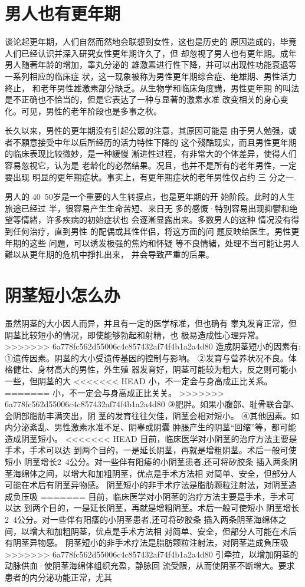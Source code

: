 \documentclass[12pt,UTF8]{ctexbook}
\begin{document}
\section{男人也有更年期}

谈论起更年期，人们自然而然地会联想到女性，这也是历史的
原因造成的，毕竟人们已经认识并深入研究女性更年期许久了，但
却忽视了男人也有更年期。成年男人随著年龄的增加，睾丸分泌的
雄激素进行性下降，并可以出现性功能衰退等一系列相应的临床症
状，这一现象被称为男性更年期综合症、绝雄期、男性活力終止，
和老年男性雄激素部分缺乏。从生物学和临床角度講，男性更年期
的叫法是不正确也不恰当的，但是它表达了一种与显著的激素水准
改变相关的身心变化。可见，男性的老年阶段也是多事之秋。

长久以来，男性的更年期没有引起公眾的注意，其原因可能是
由于男人勉强，或者不願意接受中年以后所经历的活力特性下降的
这个殘酷现实，而且男性更年期的临床表现比较微妙，是一种緩慢
漸进性过程，有非常大的个体差异，使得人们容易忽视它，认为是
老龄化的必然结果。况且，也并不是所有的老年男性，一定要出现
明显的更年期症状。事实上，有更年期症状的老年男性仅占约 三
分之一.

男人的 40~50岁是一个重要的人生转捩点，也是更年期的开
始阶段。此时的人生旅途已经过
半，很容易产生生命苦短、来日无
多的感慨·特别容易出现抑鬱和绝
望等情緒，许多疾病的初始症状也
会逐漸显露出来。多数男人的这种
情况没有得到任何治疗，直到男性
的配偶或其性伴侣，将这方面的问
题反映给医生。男性更年期的这些
问題，可以诱发极强的焦灼和怀疑
等不良情緒，处理不当可能让男人
難以从更年期的危机中掙扎出来，
并会导致严重的后果。

\section{阴茎短小怎么办}

虽然阴茎的大小因人而异，并且有一定的医学标准，但也确有
睾丸发育正常，但阴茎比较短小的情况，即使能够勃起和射精，也
极易造成性心理异常。
>>>>>>> 6a778fc562d55006c4c857432af74f4b1a2a4d80
造成阴茎短小的因素有:
①遗传因素。阴茎的大小受遗传基因的控制与影响。
②发育与营养状况不良。体格健壮、身材高大的男性，外生殖
器发育好，阴茎可能较为粗大，反之则可能小一些，但阴茎的大
<<<<<<< HEAD
小，不一定会与身高成正比关系。
=======
小，不一定会与身高成正比关关。
>>>>>>> 6a778fc562d55006c4c857432af74f4b1a2a4d80
③肥胖。如果小腹部、耻骨联合部、会阴部脂肪丰满突出，阴
茎的发育往往欠佳，阴茎会相对短小。
④其他因素。如内分泌紊乱、男性激素水准不足、阴睾或阴囊
肿脹产生的阴茎“回缩”等，都可能造成阴茎短小。
<<<<<<< HEAD
目前，临床医学对小阴茎的治疗方法主要是手术，手术可以达
到两个目的，一是延长阴茎，再就是增粗阴茎。术后一般可使短小
阴茎增长2~4公分。对一些伴有阳痿的小阴茎患者,还可将矽胶条
插入两条阴茎海绵体之间，以增大和加粗阴茎，优点是手术方法相
对简单、安全，但部分人可能在术后有阴茎异物感。
阴茎短小的非手术疗法是脂肪颗粒注射法，对阴茎造成负压吸
=======
目前，临床医学对小阴茎的治疗方法主要是手术，手术可以达
到两个目的，一是延长阴茎，再就是增粗阴茎。术后一般可使短小
阴茎增长2~4公分。对一些伴有阳痿的小阴茎患者,还可将矽胶条
插入两条阴茎海绵体之间，以增大和加粗阴茎，优点是手术方法相
对简单、安全，但部分人可能在术后有阴茎异物感。
阴茎短小的非手术疗法是脂肪颗粒注射法，对阴茎造成負压吸
>>>>>>> 6a778fc562d55006c4c857432af74f4b1a2a4d80
引牵拉，以增加阴茎的动脉供血·使阴茎海绵体组织充盈，静脉回
流受限，从而使阴茎不断增大。要求患者的内分泌功能正常，尤其
\end{document}
